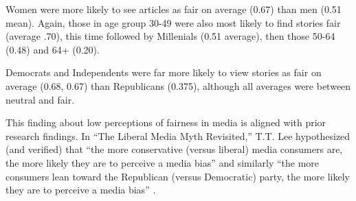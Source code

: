
Women were more likely to see articles as fair on average (0.67) than men (0.51 mean).
Again, those in age group 30-49 were also most likely to find stories fair (average .70), this time followed by Millenials (0.51 average), then those 50-64 (0.48) and 64+ (0.20).

Democrats and Independents were far more likely to view stories as fair on average (0.68, 0.67) than Republicans (0.375), although all averages were between neutral and fair.

This finding about low perceptions of fairness in media is aligned with prior research findings. In ``The Liberal Media Myth Revisited,'' T.T. Lee hypothesized (and verified) that ``the more conservative (versus liberal) media consumers are, the more likely they are to perceive a media bias'' and similarly ``the more consumers lean toward the Republican (versus Democratic) party, the more likely they are to perceive a media bias'' \cite{lee2005liberal}.


 


